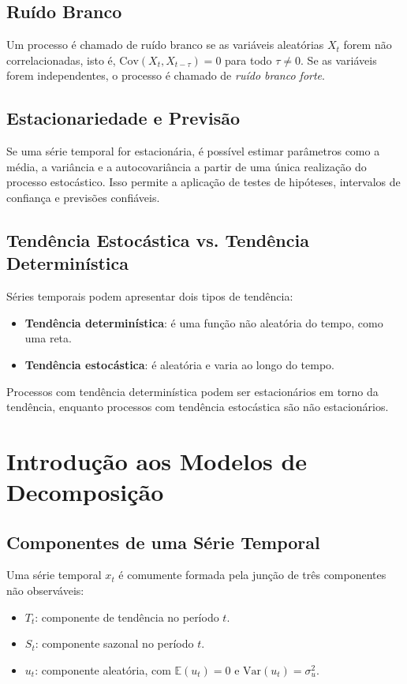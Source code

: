 \documentclass{sciposter}
\begin{document}
\begin{multicols}{3}
\subsection{Ruído Branco}
Um processo é chamado de ruído branco se as variáveis aleatórias $X_t$ forem não correlacionadas, isto é, $\text{Cov}(X_t, X_{t-\tau}) = 0$ para todo $\tau \neq 0$. Se as variáveis forem independentes, o processo é chamado de \textit{ruído branco forte}.

\subsection{Estacionariedade e Previsão}
Se uma série temporal for estacionária, é possível estimar parâmetros como a média, a variância e a autocovariância a partir de uma única realização do processo estocástico. Isso permite a aplicação de testes de hipóteses, intervalos de confiança e previsões confiáveis.

\subsection{Tendência Estocástica vs. Tendência Determinística}
Séries temporais podem apresentar dois tipos de tendência:
\begin{itemize}
    \item \textbf{Tendência determinística}: é uma função não aleatória do tempo, como uma reta.
    \item \textbf{Tendência estocástica}: é aleatória e varia ao longo do tempo.
\end{itemize}
Processos com tendência determinística podem ser estacionários em torno da tendência, enquanto processos com tendência estocástica são não estacionários.

\section{\textbf{Introdução aos Modelos de Decomposição}}

\subsection{Componentes de uma Série Temporal}
Uma série temporal $x_t$ é comumente formada pela junção de três componentes não observáveis:
\begin{itemize}
    \item $T_t$: componente de tendência no período $t$.
    \item $S_t$: componente sazonal no período $t$.
    \item $u_t$: componente aleatória, com $\mathbb{E}(u_t) = 0$ e $\text{Var}(u_t) = \sigma_u^2$.
\end{itemize}


\end{multicols}
\end{document}
